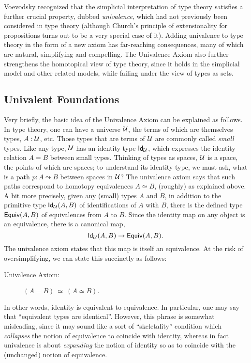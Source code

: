 Voevodsky recognized that the simplicial interpretation of type theory satisfies a further crucial property, dubbed \emph{univalence}, which had not previously been considered in type theory (although Church's principle of extensionality for propositions turns out to be a very special case of it).
Adding univalence to type theory in the form of a new axiom has far-reaching consequences, many of which are natural, simplifying and compelling.
The Univalence Axiom also further strengthens the homotopical view of type theory, since it holds in the simplicial model and other related models, while failing under the view of types as sets.

\subsection*{Univalent Foundations}

Very briefly, the basic idea of the Univalence Axiom can be explained as follows.
In type theory, one can have a universe $\UU$, the terms of which are themselves types, $A : \UU$, etc.
Those types that are terms of $\UU$ are commonly called \emph{small} types.
Like any type, $\UU$ has an identity type $\idtypevar{\UU}$, which expresses the identity relation $A = B$ between small types.
Thinking of types as spaces, $\UU$ is a space, the points of which are spaces; to understand its identity type, we must ask, what is a path $p : A \leadsto B$ between spaces in $\UU$?
The univalence axiom says that such paths correspond to homotopy equivalences $A\simeq B$, (roughly) as explained above.
A bit more precisely, given any (small) types $A$ and $B$, in addition to the primitive type $\idtype[\UU]AB$ of identifications of $A$ with $B$, there is the defined type $\texteqv AB$ of equivalences from $A$ to $B$.
Since the identity map on any object is an equivalence, there is a canonical map,
\[\idtype[\UU]AB\to\texteqv AB.\]
The univalence axiom states that this map is itself an equivalence.
At the risk of oversimplifying, we can state this succinctly as follows:

\begin{description}
\item[Univalence Axiom:]  $(A = B)\ \simeq\ (A\simeq B)$.
\end{description}
%
In other words, identity is equivalent to equivalence. 
In particular, one may say that ``equivalent types are identical''.
However, this phrase is somewhat misleading, since it may sound like a sort of ``skeletality'' condition which \emph{collapses} the notion of equivalence to coincide with identity, whereas in fact univalence is about \emph{expanding} the notion of identity so as to coincide with the (unchanged) notion of equivalence.

